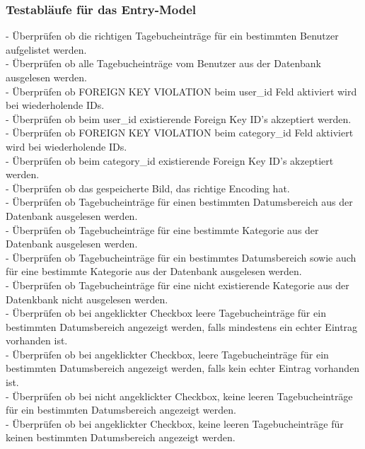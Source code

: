 \subsubsection*{Testabläufe für das Entry-Model}
- Überprüfen ob die richtigen Tagebucheinträge für ein bestimmten Benutzer aufgelistet werden.\\
- Überprüfen ob alle Tagebucheinträge vom Benutzer aus der Datenbank ausgelesen werden.\\
- Überprüfen ob FOREIGN KEY VIOLATION beim user\_id Feld aktiviert wird bei wiederholende IDs.\\
- Überprüfen ob beim user\_id existierende Foreign Key ID's akzeptiert werden.\\
- Überprüfen ob FOREIGN KEY VIOLATION beim category\_id Feld aktiviert wird bei wiederholende IDs.\\
- Überprüfen ob beim category\_id existierende Foreign Key ID's akzeptiert werden.\\
- Überprüfen ob das gespeicherte Bild, das richtige Encoding hat.\\
- Überprüfen ob Tagebucheinträge für einen bestimmten Datumsbereich aus der Datenbank ausgelesen werden.\\
- Überprüfen ob Tagebucheinträge für eine bestimmte Kategorie aus der Datenbank ausgelesen werden.\\
- Überprüfen ob Tagebucheinträge für ein bestimmtes Datumsbereich sowie auch für eine bestimmte Kategorie aus der Datenbank ausgelesen werden.\\
- Überprüfen ob Tagebucheinträge für eine nicht existierende Kategorie aus der Datenkbank nicht ausgelesen werden.\\
- Überprüfen ob bei angeklickter Checkbox leere Tagebucheinträge für ein bestimmten Datumsbereich angezeigt werden, falls mindestens ein echter Eintrag vorhanden ist.\\
- Überprüfen ob bei angeklickter Checkbox, leere Tagebucheinträge für ein bestimmten Datumsbereich angezeigt werden, falls kein echter Eintrag vorhanden ist.\\
- Überprüfen ob bei nicht angeklickter Checkbox, keine leeren Tagebucheinträge für ein bestimmten Datumsbereich angezeigt werden.\\
- Überprüfen ob bei angeklickter Checkbox, keine leeren Tagebucheinträge für keinen bestimmten Datumsbereich angezeigt werden.

